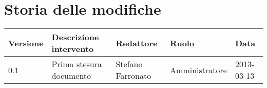 \newcommand{\docName}{Manuale di installazione}
\newcommand{\docFileName}{manuale\_di\_installazione}
\newcommand{\docVers}{1.0}
\newcommand{\creationDate}{2013-03-13}
\newcommand{\modificationDate}{2013-03-15}
\newcommand{\docState}{Approvato}
\newcommand{\docUsage}{Esterno}
\newcommand{\docDistributionList}{Installatore del sistema}
\newcommand{\docAuthors}{Stefano Farronato}
\newcommand{\approvedBy}{Andrea Rizzi}
\newcommand{\verifiedBy}{}
\newcommand{\docRoot}{..}
\def\INDICETABELLE{false}
\def\INDICEFIGURE{false}







\section*{Storia delle modifiche}

\begin{tabularx}{\textwidth}{lXlll}
\toprule
Versione & Descrizione intervento & Redattore & Ruolo & Data\\
\midrule %
0.1 & Prima stesura documento & Stefano Farronato & Amministratore & 2013-03-13\\
\bottomrule
\end{tabularx}
\newpage



\setcounter{page}{1}
\pagestyle{normal}

